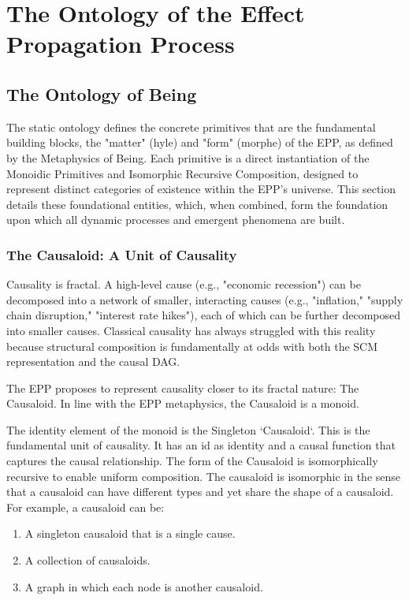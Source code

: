 \section{The Ontology of the Effect Propagation Process}
\label{sec:epp_ontology}

\subsection{The Ontology of Being}
\label{sec:ontology_being}

The static ontology defines the concrete primitives that are the fundamental building blocks, the "matter" (hyle) and "form" (morphe) of the  EPP, as defined by the Metaphysics of Being. Each primitive is a direct instantiation of the Monoidic Primitives and Isomorphic Recursive Composition, designed to  represent distinct categories of existence within the EPP's universe. This section details these foundational entities, which, when combined, form the foundation upon which all dynamic processes and emergent phenomena are built.

\subsubsection{The Causaloid: A Unit of Causality}
\label{sec:ontology_causaloid}

Causality is fractal. A high-level cause (e.g., "economic recession") can be decomposed into a network of smaller, interacting causes (e.g., "inflation," "supply  chain disruption," "interest rate hikes"), each of which can be further decomposed into smaller causes. Classical causality has always struggled with this reality because structural composition is fundamentally at odds with both the SCM representation and the  causal DAG. 

The EPP proposes to represent causality closer to its fractal nature: The Causaloid. In line with 
the EPP metaphysics, the Causaloid is a  monoid.   

The identity element of the monoid is the Singleton `Causaloid`. This is the fundamental unit of causality. It has an id as identity and a causal function that captures the causal relationship. The form of the Causaloid is isomorphically recursive to enable uniform composition. The causaloid is isomorphic in the sense that a causaloid can have different types and yet share the shape of a causaloid. For example, a causaloid can be:

\begin{enumerate}
	\item A singleton causaloid that is a single cause.
	\item A collection of causaloids.
	\item A graph in which each node is another causaloid. 
\end{enumerate}


